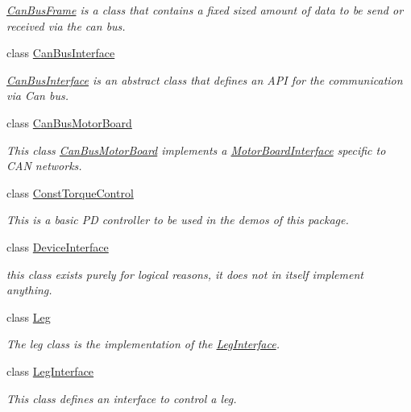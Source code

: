 \begin{DoxyCompactItemize}
\begin{DoxyCompactList}\small\item\em \hyperlink{classblmc__drivers_1_1CanBusFrame}{Can\+Bus\+Frame} is a class that contains a fixed sized amount of data to be send or received via the can bus. \end{DoxyCompactList}\item 
class \hyperlink{classblmc__drivers_1_1CanBusInterface}{Can\+Bus\+Interface}
\begin{DoxyCompactList}\small\item\em \hyperlink{classblmc__drivers_1_1CanBusInterface}{Can\+Bus\+Interface} is an abstract class that defines an A\+PI for the communication via Can bus. \end{DoxyCompactList}\item 
class \hyperlink{classblmc__drivers_1_1CanBusMotorBoard}{Can\+Bus\+Motor\+Board}
\begin{DoxyCompactList}\small\item\em This class \hyperlink{classblmc__drivers_1_1CanBusMotorBoard}{Can\+Bus\+Motor\+Board} implements a \hyperlink{classblmc__drivers_1_1MotorBoardInterface}{Motor\+Board\+Interface} specific to C\+AN networks. \end{DoxyCompactList}\item 
class \hyperlink{classblmc__drivers_1_1ConstTorqueControl}{Const\+Torque\+Control}
\begin{DoxyCompactList}\small\item\em This is a basic PD controller to be used in the demos of this package. \end{DoxyCompactList}\item 
class \hyperlink{classblmc__drivers_1_1DeviceInterface}{Device\+Interface}
\begin{DoxyCompactList}\small\item\em this class exists purely for logical reasons, it does not in itself implement anything. \end{DoxyCompactList}\item 
class \hyperlink{classblmc__drivers_1_1Leg}{Leg}
\begin{DoxyCompactList}\small\item\em The leg class is the implementation of the \hyperlink{classblmc__drivers_1_1LegInterface}{Leg\+Interface}. \end{DoxyCompactList}\item 
class \hyperlink{classblmc__drivers_1_1LegInterface}{Leg\+Interface}
\begin{DoxyCompactList}\small\item\em This class defines an interface to control a leg. \end{DoxyCompactList}\item 

\end{DoxyCompactItemize}
